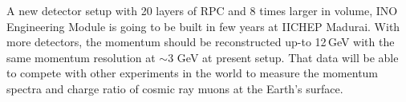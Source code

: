 A new detector setup with 20 layers of RPC and 8 times larger in volume,
INO Engineering Module is going to be built in few years at IICHEP
Madurai. With more detectors, the momentum should be
reconstructed up-to 12\,GeV with the same momentum resolution at
$\sim$3 GeV at present setup. That data will be able to compete
with other experiments in the world to measure the momentum spectra
and charge ratio of cosmic ray muons at the Earth's surface.
